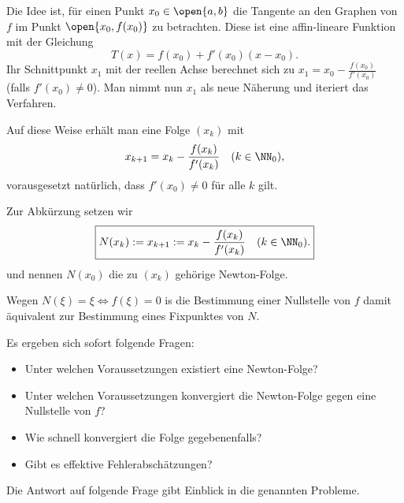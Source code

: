 \begin{antwort}
  Die Idee ist, für einen Punkt $x_0\in \open{a,b}$ die Tangente an den 
  Graphen von $f$ im Punkt $\open{x_0,f(x_0)}$ zu betrachten. Diese ist eine 
  affin-lineare Funktion mit der Gleichung
  \[
  T(x) = f(x_0) + f'(x_0) (x-x_0).
  \]
  Ihr Schnittpunkt $x_1$ mit der reellen Achse berechnet sich zu 
  $x_1 = x_0 - \frac{f(x_0)}{f'(x_0)}$ (falls $f'(x_0) \not=0$). Man nimmt 
  nun $x_1$ als neue Näherung und iteriert das Verfahren. 
  
  Auf diese Weise erhält man eine Folge $(x_k)$ mit 
  \[
  x_{k+1} = x_k - \frac{f(x_k)}{f'(x_k)}\quad (k \in \NN_0),
  \]
  vorausgesetzt natürlich, dass $f'(x_0) \not=0$ für alle $k$ gilt. 

  Zur Abkürzung setzen wir 
  \[
  \boxed{N(x_k) := x_{k+1} := x_k - \frac{f(x_k)}{f'(x_k)} \quad (k\in \NN_0).}
  \]
  und nennen $N(x_0)$ die zu $(x_k)$ gehörige Newton-Folge. 

  Wegen $N(\xi)=\xi \Leftrightarrow f(\xi)=0$ is die Bestimmung einer 
  Nullstelle von $f$ damit äquivalent zur  
  Bestimmung eines Fixpunktes von $N$. 

  \medskip
  \noindent
  Es ergeben sich sofort folgende Fragen:
  \begin{itemize}
  \item Unter welchen Voraussetzungen existiert eine Newton-Folge?
  \item Unter welchen Voraussetzungen konvergiert die Newton-Folge gegen 
    eine Nullstelle von $f$?
  \item Wie schnell konvergiert die Folge gegebenenfalls?
  \item Gibt es effektive Fehlerabschätzungen?
  \end{itemize}   
  Die Antwort auf folgende Frage gibt Einblick in die genannten Probleme. \AntEnd 
\end{antwort}


